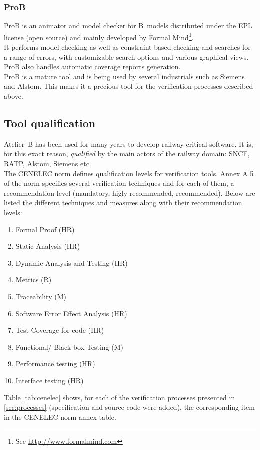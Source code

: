 \documentclass{article}
\begin{document}
\subsubsection{ProB}
\label{subsec:prob}
ProB is an animator and model checker for B~models distributed under the EPL license (open source) and mainly developed by Formal Mind\footnote{See \url{http://www.formalmind.com}}.\\
It performs model checking as well as constraint-based checking and searches for a range of errors, with customizable search options and various graphical views. ProB also handles automatic coverage reports generation.\\
ProB is a mature tool and is being used by several industrials such as Siemens and Alstom. This makes it a precious tool for the verification processes described above.

\subsection{Tool qualification}
\label{subsec:qualif}
Atelier~B has been used for many years to develop railway critical software. It is, for this exact reason, {\itshape qualified} by the main actors of the railway domain: SNCF, RATP, Alstom, Siemens etc.\\

The CENELEC norm defines qualification levels for verification tools. Annex A 5 of the norm specifies several verification techniques and for each of them, a recommendation level (mandatory, higly recommended, recommended). Below are listed the different techniques and measures along with their recommendation levels:
\begin{enumerate}
\item Formal Proof (HR)
\item Static Analysis (HR)
\item Dynamic Analysis and Testing (HR)
\item Metrics (R)
\item Traceability (M)
\item Software Error Effect Analysis (HR)
\item Test Coverage for code (HR)
\item Functional/ Black-box Testing (M)
\item Performance testing (HR)
\item Interface testing (HR)
\end{enumerate}

Table \ref{tab:cenelec} shows, for each of the verification processes presented in \ref{sec:processes} (specification and source code were added), the corresponding item in the CENELEC norm annex table.
\end{document}
